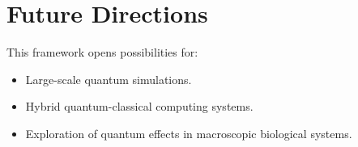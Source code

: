 \documentclass{article}
\theoremstyle{plain}
\begin{document}
\section{Future Directions}
This framework opens possibilities for:
\begin{itemize}
    \item Large-scale quantum simulations.
    \item Hybrid quantum-classical computing systems.
    \item Exploration of quantum effects in macroscopic biological systems.
\end{itemize}

\nocite{*}


\end{document}
